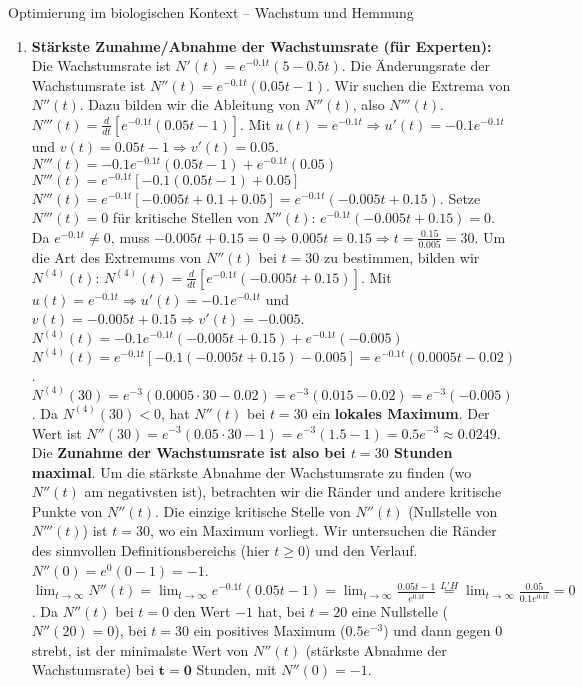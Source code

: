 \begin{loesungsumgebung}{Optimierung im biologischen Kontext – Wachstum und Hemmung}
\begin{enumerate}[label=(\alph*)]
    \item \textbf{Stärkste Zunahme/Abnahme der Wachstumsrate (für Experten):}
    Die Wachstumsrate ist $N'(t) = e^{-0.1t}(5 - 0.5t)$. Die Änderungsrate der Wachstumsrate ist $N''(t) = e^{-0.1t}(0.05t - 1)$. Wir suchen die Extrema von $N''(t)$. Dazu bilden wir die Ableitung von $N''(t)$, also $N'''(t)$.
    $N'''(t) = \frac{d}{dt} [e^{-0.1t}(0.05t - 1)]$.
    Mit $u(t)=e^{-0.1t} \Rightarrow u'(t)=-0.1e^{-0.1t}$ und $v(t)=0.05t-1 \Rightarrow v'(t)=0.05$.
    $N'''(t) = -0.1e^{-0.1t}(0.05t - 1) + e^{-0.1t}(0.05)$
    $N'''(t) = e^{-0.1t}[-0.1(0.05t - 1) + 0.05]$
    $N'''(t) = e^{-0.1t}[-0.005t + 0.1 + 0.05] = e^{-0.1t}(-0.005t + 0.15)$.
    Setze $N'''(t)=0$ für kritische Stellen von $N''(t)$:
    $e^{-0.1t}(-0.005t + 0.15) = 0$.
    Da $e^{-0.1t} \neq 0$, muss $-0.005t + 0.15 = 0 \Rightarrow 0.005t = 0.15 \Rightarrow t = \frac{0.15}{0.005} = 30$.
    Um die Art des Extremums von $N''(t)$ bei $t=30$ zu bestimmen, bilden wir $N^{(4)}(t)$:
    $N^{(4)}(t) = \frac{d}{dt} [e^{-0.1t}(-0.005t + 0.15)]$.
    Mit $u(t)=e^{-0.1t} \Rightarrow u'(t)=-0.1e^{-0.1t}$ und $v(t)=-0.005t+0.15 \Rightarrow v'(t)=-0.005$.
    $N^{(4)}(t) = -0.1e^{-0.1t}(-0.005t + 0.15) + e^{-0.1t}(-0.005)$
    $N^{(4)}(t) = e^{-0.1t}[-0.1(-0.005t + 0.15) - 0.005] = e^{-0.1t}(0.0005t - 0.02)$.
    $N^{(4)}(30) = e^{-3}(0.0005 \cdot 30 - 0.02) = e^{-3}(0.015 - 0.02) = e^{-3}(-0.005)$.
    Da $N^{(4)}(30) < 0$, hat $N''(t)$ bei $t=30$ ein \textbf{lokales Maximum}.
    Der Wert ist $N''(30) = e^{-3}(0.05 \cdot 30 - 1) = e^{-3}(1.5 - 1) = 0.5e^{-3} \approx 0.0249$.
    Die \textbf{Zunahme der Wachstumsrate ist also bei $t=30$ Stunden maximal}.
    Um die stärkste Abnahme der Wachstumsrate zu finden (wo $N''(t)$ am negativsten ist), betrachten wir die Ränder und andere kritische Punkte von $N''(t)$. Die einzige kritische Stelle von $N''(t)$ (Nullstelle von $N'''(t)$) ist $t=30$, wo ein Maximum vorliegt.
    Wir untersuchen die Ränder des sinnvollen Definitionsbereichs (hier $t \ge 0$) und den Verlauf.
    $N''(0) = e^0(0-1) = -1$.
    $\lim_{t \to \infty} N''(t) = \lim_{t \to \infty} e^{-0.1t}(0.05t - 1) = \lim_{t \to \infty} \frac{0.05t-1}{e^{0.1t}} \stackrel{L'H}{=} \lim_{t \to \infty} \frac{0.05}{0.1e^{0.1t}} = 0$.
    Da $N''(t)$ bei $t=0$ den Wert $-1$ hat, bei $t=20$ eine Nullstelle ($N''(20)=0$), bei $t=30$ ein positives Maximum ($0.5e^{-3}$) und dann gegen $0$ strebt, ist der minimalste Wert von $N''(t)$ (stärkste Abnahme der Wachstumsrate) bei $\mathbf{t=0}$ Stunden, mit $N''(0) = -1$.
\end{enumerate}

\end{loesungsumgebung}

